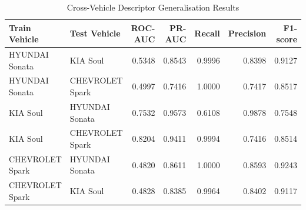 \begin{table}[t]
\centering
\begin{tabular}{llrrrrr}
\toprule
Train Vehicle & Test Vehicle & ROC-AUC & PR-AUC & Recall & Precision & F1-score \\
\midrule
HYUNDAI Sonata & KIA Soul & 0.5348 & 0.8543 & 0.9996 & 0.8398 & 0.9127 \\
HYUNDAI Sonata & CHEVROLET Spark & 0.4997 & 0.7416 & 1.0000 & 0.7417 & 0.8517 \\
KIA Soul & HYUNDAI Sonata & 0.7532 & 0.9573 & 0.6108 & 0.9878 & 0.7548 \\
KIA Soul & CHEVROLET Spark & 0.8204 & 0.9411 & 0.9994 & 0.7416 & 0.8514 \\
CHEVROLET Spark & HYUNDAI Sonata & 0.4820 & 0.8611 & 1.0000 & 0.8593 & 0.9243 \\
CHEVROLET Spark & KIA Soul & 0.4828 & 0.8385 & 0.9964 & 0.8402 & 0.9117 \\
\bottomrule
\end{tabular}
\caption{Cross-Vehicle Descriptor Generalisation Results}
\label{tab:cross-vehicle-generalisation}
\end{table}
